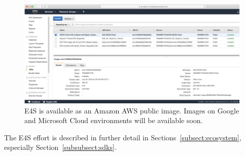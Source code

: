\begin{figure}
	\centering
	\includegraphics[width=0.9\linewidth]{E4S-AWS-public-image}
	\caption{E4S is available as an Amazon AWS public image.  Images on Google and Microsoft Cloud environments will be available soon.}
	\label{fig:e4s-aws-image}
\end{figure}


The E4S effort is described in further detail in Sections~\ref{subsect:ecosystem}, especially Section~\ref{subsubsect:sdks}.

